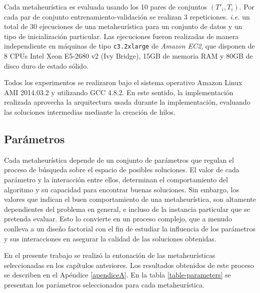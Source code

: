 Cada metaheurística es evaluada usando los 10 pares de conjuntos $(T'_i, T_i)$. Por cada par de conjunto entrenamiento-validación se realizan 3 repeticiones. \emph{i.e.} un total de 30 ejecuciones de una metaheurística para un conjunto de datos y un tipo de inicialización particular. Las ejecuciones fueron realizadas de manera independiente en máquinas de tipo \texttt{c3.2xlarge} de \emph{Amazon EC2}, que disponen de 8 CPUs Intel Xeon E5-2680 v2 (Ivy Bridge), 15GB de memoria RAM y 80GB de disco duro de estado sólido.

Todos los experimentos se realizaron bajo el sistema operativo Amazon Linux AMI 2014.03.2 y utilizando GCC 4.8.2. En este sentido, la implementación realizada aprovecha la arquitectura usada durante la implementación, evaluando las soluciones intermedias mediante la creación de hilos.

\subsection{Parámetros}
\label{sec-parametros}

Cada metaheurística depende de un conjunto de parámetros que regulan el proceso de búsqueda sobre el espacio de posibles soluciones. El valor de cada parámetro y la interacción entre ellos, determinan el comportamiento del algoritmo y su capacidad para encontrar buenas soluciones. Sin embargo, los valores que indican el buen comportamiento de una metaheurística, son altamente dependientes del problema en general, e incluso de la instancia particular que se pretenda evaluar. Esto lo convierte en un proceso complejo, que a menudo conlleva a un diseño factorial con el fin de estudiar la influencia de los parámetros y sus interacciones en asegurar la calidad de las soluciones obtenidas.

En el presente trabajo se realizó la entonación de las metaheurísticas seleccionadas en los capítulos anteriores. Los resultados obtenidos de este proceso se describen en el Apéndice \ref{apendiceA}. En la tabla \ref{table-parameters} se presentan los parámetros seleccionados para cada metaheurística.

